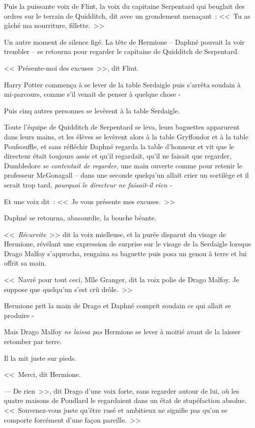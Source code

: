 Puis la puissante voix de Flint, la voix du capitaine Serpentard qui beuglait des ordres sur le terrain de Quidditch, dit avec un grondement menaçant~: <<~Tu as gâché ma nourriture, fillette.~>>

Un autre moment de silence figé. La tête de Hermione -- Daphné pouvait la voir trembler -- se retourna pour regarder le capitaine de Quidditch de Serpentard.

<<~Présente-moi des excuses~>>, dit Flint.

Harry Potter commença à se lever de la table Serdaigle puis s'arrêta soudain à mi-parcours, comme s'il venait de penser à quelque chose -

Puis cinq autres personnes se levèrent à la table Serdaigle.

Toute l'équipe de Quidditch de Serpentard se leva, leurs baguettes apparurent dans leurs mains, et les élèves se levèrent alors à la table Gryffondor et à la table Poufsouffle, et sans réfléchir Daphné regarda la table d'honneur et vit que le directeur était toujours assis et qu'il regardait, qu'il ne faisait que regarder, Dumbledore \emph{se contentait de regarder}, une main ouverte comme pour retenir le professeur McGonagall -- dans une seconde quelqu'un allait crier un sortilège et il serait trop tard, \emph{pourquoi le directeur ne faisait-il rien -}

Et une voix dit~: <<~Je vous présente mes excuses.~>>

Daphné se retourna, abasourdie, la bouche béante.

<<~\emph{Récurvite}~>> dit la voix mielleuse, et la purée disparut du visage de Hermione, révélant une expression de surprise sur le visage de la Serdaigle lorsque Drago Malfoy s'approcha, rengaina sa baguette puis posa un genou à terre et lui offrit sa main.

<<~Navré pour tout ceci, Mlle Granger, dit la voix polie de Drago Malfoy. Je suppose que quelqu'un s'est crû drôle.~>>

Hermione prit la main de Drago et Daphné comprit soudain ce qui allait se produire -

Mais Drago Malfoy \emph{ne laissa pas} Hermione se lever à moitié avant de la laisser retomber par terre.

Il la mit juste sur pieds.

<<~Merci, dit Hermione.

--- De rien~>>, dit Drago d'une voix forte, sans regarder autour de lui, où les quatre maisons de Poudlard le regardaient dans un état de stupéfaction absolue. <<~Souvenez-vous juste qu'être rusé et ambitieux ne signifie pas qu'on se comporte forcément d'une façon pareille.~>>

